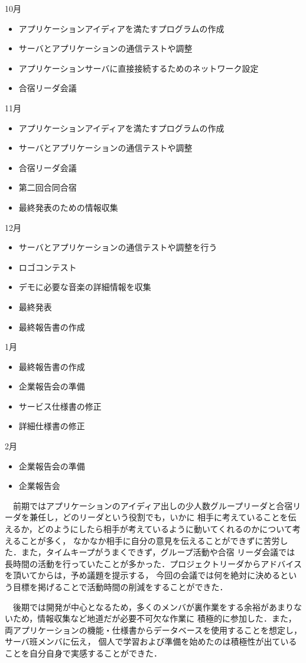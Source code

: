 10月
\begin{itemize}
\item アプリケーションアイディアを満たすプログラムの作成
\item サーバとアプリケーションの通信テストや調整
\item アプリケーションサーバに直接接続するためのネットワーク設定
\item 合宿リーダ会議
\end{itemize}
11月
\begin{itemize}
\item アプリケーションアイディアを満たすプログラムの作成
\item サーバとアプリケーションの通信テストや調整
\item 合宿リーダ会議
\item 第二回合同合宿
\item 最終発表のための情報収集
\end{itemize}
12月
\begin{itemize}
\item サーバとアプリケーションの通信テストや調整を行う
\item ロゴコンテスト
\item デモに必要な音楽の詳細情報を収集
\item 最終発表
\item 最終報告書の作成
\end{itemize}
1月
\begin{itemize}
\item 最終報告書の作成
\item 企業報告会の準備
\item サービス仕様書の修正
\item 詳細仕様書の修正
\end{itemize}
2月
\begin{itemize}
\item 企業報告会の準備
\item 企業報告会
\end{itemize}

\par
　前期ではアプリケーションのアイディア出しの少人数グループリーダと合宿リーダを兼任し，どのリーダという役割でも，いかに
相手に考えていることを伝えるか，どのようにしたら相手が考えているように動いてくれるのかについて考えることが多く，
なかなか相手に自分の意見を伝えることができずに苦労した．また，タイムキープがうまくできず，グループ活動や合宿
リーダ会議では長時間の活動を行っていたことが多かった．プロジェクトリーダからアドバイスを頂いてからは，予め議題を提示する，
今回の会議では何を絶対に決めるという目標を掲げることで活動時間の削減をすることができた．
\par
　後期では開発が中心となるため，多くのメンバが裏作業をする余裕があまりないため，情報収集など地道だが必要不可欠な作業に
積極的に参加した．また，両アプリケーションの機能・仕様書からデータベースを使用することを想定し，サーバ班メンバに伝え，
個人で学習および準備を始めたのは積極性が出ていることを自分自身で実感することができた．

